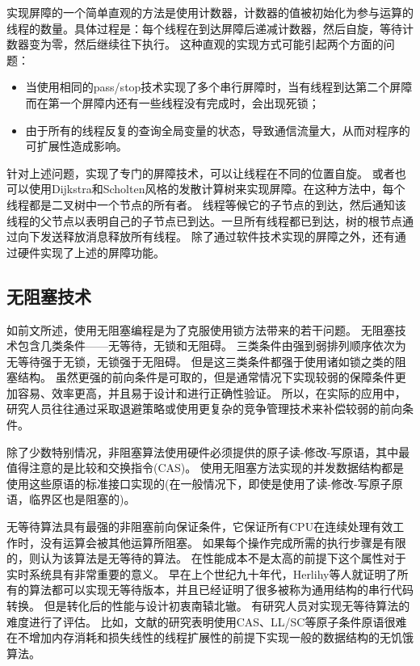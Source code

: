 实现屏障的一个简单直观的方法是使用计数器，计数器的值被初始化为参与运算的线程的数量。具体过程是：每个线程在到达屏障后递减计数器，然后自旋，等待计数器变为零，然后继续往下执行。
这种直观的实现方式可能引起两个方面的问题：
\begin{itemize}
	\item 当使用相同的pass/stop技术实现了多个串行屏障时，当有线程到达第二个屏障而在第一个屏障内还有一些线程没有完成时，会出现死锁；
	\item 由于所有的线程反复的查询全局变量的状态，导致通信流量大，从而对程序的可扩展性造成影响。
\end{itemize}
针对上述问题，实现了专门的屏障技术，可以让线程在不同的位置自旋\cite{brooks1986butterfly,hensgen1988two,mellor1992fast,tseng2016scalable}。
或者也可以使用Dijkstra和Scholten风格的发散计算树来实现屏障\cite{dijkstra1980termination}。在这种方法中，每个线程都是二叉树中一个节点的所有者。
线程等候它的子节点的到达，然后通知该线程的父节点以表明自己的子节点已到达。一旦所有线程都已到达，树的根节点通过向下发送释放消息释放所有线程。
除了通过软件技术实现的屏障之外，还有通过硬件实现了上述的屏障功能\cite{solihin2015fundamentals}。

\subsection{无阻塞技术}

如前文所述，使用无阻塞编程是为了克服使用锁方法带来的若干问题。
无阻塞技术包含几类条件——无等待\cite{lamport1974new,herlihy1991wait}，无锁\cite{herlihy1991wait}和无阻碍\cite{herlihy2003obstruction}。
三类条件由强到弱排列顺序依次为无等待强于无锁，无锁强于无阻碍。
但是这三类条件都强于使用诸如锁之类的阻塞结构。
虽然更强的前向条件是可取的，但是通常情况下实现较弱的保障条件更加容易、效率更高，并且易于设计和进行正确性验证。
所以，在实际的应用中，研究人员往往通过采取退避策略\cite{agarwal1989adaptive}或使用更复杂的竞争管理技术\cite{herlihy2003software}来补偿较弱的前向条件。

除了少数特别情况，非阻塞算法使用硬件必须提供的原子读-修改-写原语，其中最值得注意的是比较和交换指令(CAS)。
使用无阻塞方法实现的并发数据结构都是使用这些原语的标准接口实现的(在一般情况下，即使是使用了读-修改-写原子原语，临界区也是阻塞的)。

无等待算法具有最强的非阻塞前向保证条件，它保证所有CPU在连续处理有效工作时，没有运算会被其他运算所阻塞。
如果每个操作完成所需的执行步骤是有限的，则认为该算法是无等待的算法。
在性能成本不是太高的前提下这个属性对于实时系统具有非常重要的意义。
早在上个世纪九十年代，Herlihy等人就证明了所有的算法都可以实现无等待版本\cite{herlihy1988impossibility}，并且已经证明了很多被称为通用结构的串行代码转换。
但是转化后的性能与设计初衷南辕北辙。
有研究人员对实现无等待算法的难度进行了评估。
比如，文献\cite{fich2004inherent}的研究表明使用CAS、LL/SC等原子条件原语很难在不增加内存消耗和损失线性的线程扩展性的前提下实现一般的数据结构的无饥饿算法。

